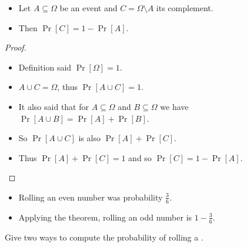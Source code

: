 \begin{frame}
  \begin{theorem}
    \begin{itemize}
      \item Let \(A\subseteq \Omega\) be an event and \(C = \Omega\setminus A\) 
        its complement.
      \item Then \(\Pr[C] = 1 - \Pr[A]\).
    \end{itemize}
  \end{theorem}

  \pause{}

  \begin{proof}
    \begin{itemize}
      \item Definition said \(\Pr[\Omega] = 1\).

        \pause{}

      \item \(A\cup C = \Omega\), thus \(\Pr[A\cup C] = 1\).

        \pause{}

      \item It also said that for \(A\subseteq \Omega\) and \(B\subseteq 
          \Omega\) we have \(\Pr[A\cup B] = \Pr[A] + \Pr[B]\).

        \pause{}

      \item So \(\Pr[A\cup C]\) is also \(\Pr[A] + \Pr[C]\).

        \pause{}

      \item Thus \(\Pr[A] + \Pr[C] = 1\) and so \(\Pr[C] = 1 - \Pr[A]\).
    \end{itemize}
  \end{proof}
\end{frame}

\begin{frame}
  \begin{example}
    \begin{itemize}
      \item Rolling an even number was probability \(\frac{3}{6}\).
      \item Applying the theorem, rolling an odd number is \(1-\frac{3}{6}\).
    \end{itemize}
  \end{example}

  \pause{}

  \begin{exercise}
    Give two ways to compute the probability of rolling a .
  \end{exercise}
\end{frame}

